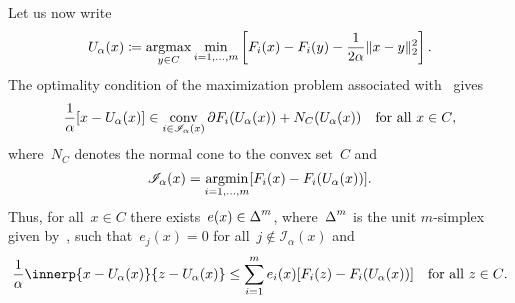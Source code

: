 \documentclass[../../main]{subfiles}
\begin{document}
Let us now write
\begin{equation} \label{eq:reg_gap_MO_sol}
    U_\alpha(x) \coloneqq \operatorname*{argmax}_{y \in C} \min_{i = 1, \dots, m} \left[ F_i(x) - F_i(y) - \frac{1}{2 \alpha}\lVert x - y\rVert_2^2 \right]
    .\end{equation}
The optimality condition of the maximization problem associated with~ gives
\begin{equation}
    \frac{1}{\alpha}  [ x - U_\alpha(x) ] \in \operatorname*{conv}_{i \in \mathscr{I}_\alpha(x)} \partial F_i(U_\alpha(x)) + N_C(U_\alpha(x)) \quad \text{for all~$x \in C$}
    ,\end{equation}
where~$N_C$ denotes the normal cone to the convex set~$C$ and
\begin{equation}
    \mathscr{I}_\alpha(x) = \operatorname*{argmin}_{i = 1, \dots, m} [ F_i(x) - F_i(U_\alpha(x)) ]
    .\end{equation}
Thus, for all~$x \in C$ there exists~$e(x) \in \operatorname{\Delta}^m$, where~$\operatorname{\Delta}^m$ is the unit $m$-simplex given by~, such that~$e_j(x) = 0$ for all~$j \notin \mathscr{I}_\alpha(x)$ and
\begin{equation} \label{eq:reg_gap_MO_opt}
    \frac{1}{\alpha} \innerp{x - U_\alpha(x)}{z - U_\alpha(x)} \le \sum_{i = 1}^{m} e_i(x) [ F_i(z) - F_i(U_\alpha(x)) ] \forallcondition{z \in C}
    .\end{equation}
\end{document}
